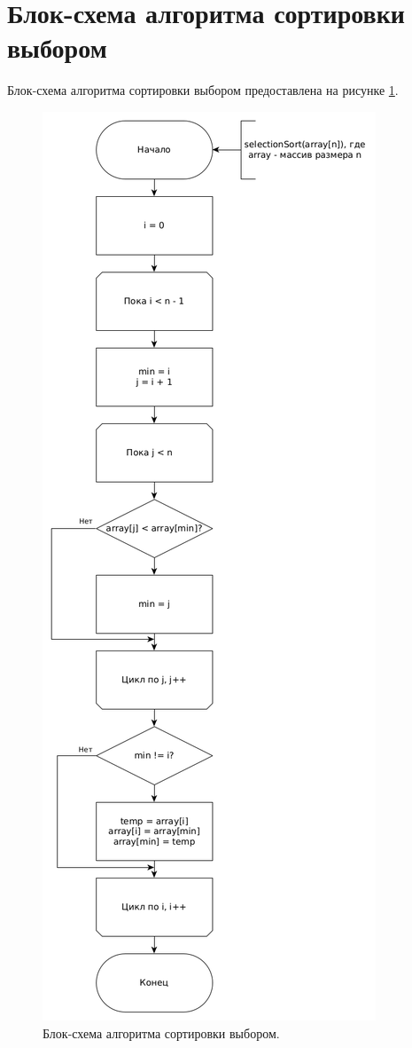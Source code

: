 \documentclass[12pt]{report}
\begin{document}
\section{Блок-схема алгоритма сортировки выбором}
Блок-схема алгоритма сортировки выбором предоставлена на рисунке \ref{img:selectionSortScheme}.

\begin{figure}
\begin{center}
\includegraphics[scale=0.33]{inc/img/selectionSort.png}
\captionsetup{justification=centering}
	\caption{Блок-схема алгоритма сортировки выбором.}
	\label{img:selectionSortScheme}	
\end{center}
\end{figure}
\end{document}
